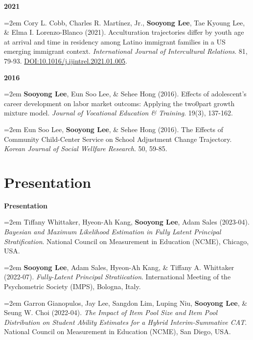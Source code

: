 \documentclass[11pt,letterpaper,]{awesome-me}
\begin{document}
\setlength{\leftskip}{0cm}

\textbf{2021}

\setlength{\leftskip}{0.5cm}

\hangindent=2em  Cory L. Cobb, Charles R. Martínez, Jr.,
\textbf{Sooyong Lee}, Tae Kyoung Lee, \& Elma I. Lorenzo-Blanco (2021).
Acculturation trajectories differ by youth age at arrival and time in
residency among Latino immigrant families in a US emerging immigrant
context. \emph{International Journal of Intercultural Relations}. 81,
79-93. \url{DOI:10.1016/j.ijintrel.2021.01.005}.

\setlength{\leftskip}{0cm}

\textbf{2016}

\setlength{\leftskip}{0.5cm}

\hangindent=2em  \textbf{Sooyong Lee}, Eun Soo Lee, \& Sehee
Hong (2016). Effects of adolescent's career development on labor market
outcoms: Applying the two0part growth mixture model. \emph{Journal of
Vocational Education \& Training}. 19(3), 137-162.

\hangindent=2em  Eun Soo Lee, \textbf{Sooyong Lee}, \& Sehee
Hong (2016). The Effects of Community Child-Center Service on School
Adjustment Change Trajectory. \emph{Korean Journal of Social Wellfare
Research}. 50, 59-85.

\setlength{\leftskip}{0cm}

\hypertarget{presentation}{%
\section{Presentation}\label{presentation}}

\setlength{\leftskip}{0cm}

\textbf{Presentation}

\setlength{\leftskip}{0.5cm}

\hangindent=2em  Tiffany Whittaker, Hyeon-Ah Kang,
\textbf{Sooyong Lee}, Adam Sales (2023-04). \emph{Bayesian and Maximum
Likelihood Estimation in Fully Latent Principal Stratification}.
National Council on Measurement in Education (NCME), Chicago, USA.

\hangindent=2em  \textbf{Sooyong Lee}, Adam Sales, Hyeon-Ah
Kang, \& Tiffany A. Whittaker (2022-07). \emph{Fully-Latent Principal
Stratiication}. International Meeting of the Psychometric Society
(IMPS), Bologna, Italy.

\hangindent=2em  Garron Gianopulos, Jay Lee, Sangdon Lim,
Luping Niu, \textbf{Sooyong Lee}, \& Seung W. Choi (2022-04). \emph{The
Impact of Item Pool Size and Item Pool Distribution on Student Ability
Estimates for a Hybrid Interim-Summative CAT}. National Council on
Measurement in Education (NCME), San Diego, USA.
\end{document}
